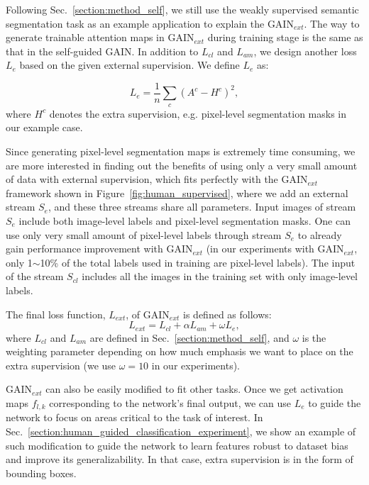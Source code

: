 \documentclass[10pt,twocolumn,letterpaper]{article}
\begin{document}
Following Sec.~\ref{section:method_self}, we still use the weakly supervised semantic segmentation task as an example application to explain the GAIN$_{ext}$. The way to generate trainable attention maps in GAIN$_{ext}$ during training stage is the same as that in the self-guided GAIN. In addition to $L_{cl}$ and $L_{am}$, we design another loss $L_e$ based on the given external supervision. We define $L_e$ as:


\begin{equation}
\label{eq:human_guided_loss}
{L_e} = \frac{1}{n}\sum\limits_c {{{\left( {{A^c} - {H^c}} \right)}^2}},
\end{equation}
where ${H^c}$ denotes the extra supervision, e.g. pixel-level segmentation masks in our example case.


Since generating pixel-level segmentation maps is extremely time consuming, we are more interested in finding out the benefits of using only a very small amount of data with external supervision, which fits perfectly with the GAIN$_{ext}$ framework shown in Figure~\ref{fig:human_supervised}, where we add an external stream ${S_e}$, and these three streams share all parameters. Input images of stream ${S_e}$ include both image-level labels and pixel-level segmentation masks. One can use only very small amount of pixel-level labels through stream ${S_e}$ to already gain performance improvement with GAIN$_{ext}$ (in our experiments with GAIN$_{ext}$, only 1$\sim$10\% of the total labels used in training are pixel-level labels). The input of the stream $S_{cl}$ includes all the images in the training set with only image-level labels.


The final loss function, $L_{ext}$, of GAIN$_{ext}$ is defined as follows:
\begin{equation}
\label{eq:human_guidance_loss_final}
L_{ext} = L_{cl} + \alpha L_{am} + \omega L_e,
\end{equation}
where $L_{cl}$ and $L_{am}$ are defined in Sec.~\ref{section:method_self}, and $\omega$ is the weighting parameter depending on how much emphasis we want to place on the extra supervision (we use $\omega  = 10$ in our experiments).


GAIN$_{ext}$ can also be easily modified to fit other tasks. Once we get activation maps $f_{l,k}$ corresponding to the network's final output, we can use $L_e$ to guide the network to focus on areas critical to the task of interest. In Sec.~\ref{section:human_guided_classification_experiment}, we show an example of such modification to guide the network to learn features robust to dataset bias and improve its generalizability. In that case, extra supervision is in the form of bounding boxes. %
\end{document}
